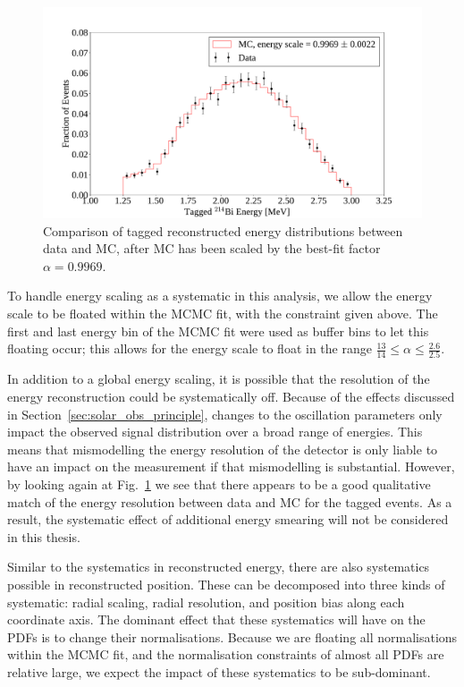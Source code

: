 \begin{figure}
    \centering
    \includegraphics[width=\textwidth]{6_SolarAnalysis/images/rafael_tagged_bi214_data_vs_mc_energy_comparison_resized.pdf}
    \caption[Comparison of tagged  reconstructed energy distributions between data and MC]
    {Comparison of tagged  reconstructed energy distributions between data and MC, after MC has been scaled by the best-fit factor $\alpha = 0.9969$.}
    \label{fig:bi214_escale_calibration}
\end{figure}

To handle energy scaling as a systematic in this analysis, we allow the energy scale to be floated within the MCMC fit, with the constraint given above. The first and last energy bin of the MCMC fit were used as buffer bins to let this floating occur; this allows for the energy scale to float in the range $\frac{13}{14}\leq\alpha\leq\frac{2.6}{2.5}$.

In addition to a global energy scaling, it is possible that the resolution of the energy reconstruction could be systematically off. Because of the effects discussed in Section~\ref{sec:solar_obs_principle}, changes to the oscillation parameters only impact the observed signal distribution over a broad range of energies. This means that mismodelling the energy resolution of the detector is only liable to have an impact on the measurement if that mismodelling is substantial. However, by looking again at Fig.~\ref{fig:bi214_escale_calibration} we see that there appears to be a good qualitative match of the energy resolution between data and MC for the tagged  events. As a result, the systematic effect of additional energy smearing will not be considered in this thesis.

Similar to the systematics in reconstructed energy, there are also systematics possible in reconstructed position. These can be decomposed into three kinds of systematic: radial scaling, radial resolution, and position bias along each coordinate axis. The dominant effect that these systematics will have on the PDFs is to change their normalisations. Because we are floating all normalisations within the MCMC fit, and the normalisation constraints of almost all PDFs are relative large, we expect the impact of these systematics to be sub-dominant.

